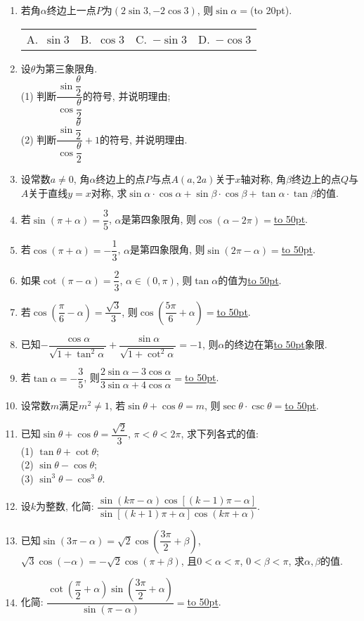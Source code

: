 \documentclass[10pt,a4paper]{article}
\newcommand{\blank}[1]{\underline{\hbox to #1pt{}}}
\newcommand{\bracket}[1]{(\hbox to #1pt{})}
\newcommand{\fourch}[4]{\par\begin{tabular}{p{.23\textwidth}p{.23\textwidth}p{.23\textwidth}p{.23\textwidth}}
A.~#1 &B.~#2& C.~#3& D.~#4
\end{tabular}}
\begin{document}
\begin{enumerate}[1.]
\item 若角$\alpha$终边上一点$P$为$(2\sin 3,-2\cos 3)$, 则$\sin\alpha=$\bracket{20}.
\fourch{$\sin 3$}{$\cos 3$}{$-\sin 3$}{$-\cos 3$}
\item 设$\theta$为第三象限角.\\
(1) 判断$\dfrac{\sin\dfrac{\theta}2}{\cos\dfrac{\theta}2}$的符号, 并说明理由;\\
(2) 判断$\dfrac{\sin \dfrac{\theta }2}{\cos \dfrac{\theta }2}+1$的符号, 并说明理由.
\item 设常数$a\ne 0$, 角$\alpha$终边上的点$P$与点$A(a,2a)$关于$x$轴对称, 角$\beta$终边上的点$Q$与$A$关于直线$y=x$对称, 求$\sin\alpha\cdot \cos\alpha+\sin\beta\cdot\cos\beta+\tan\alpha\cdot\tan\beta$的值.


\item 若$\sin(\pi +\alpha)=\dfrac 35$, $\alpha$是第四象限角, 则$\cos(\alpha-2\pi)=$\blank{50}.
\item 若$\cos(\pi+\alpha)=-\dfrac 13$, $\alpha$是第四象限角, 则$\sin(2\pi-\alpha)=$\blank{50}.
\item 如果$\cot(\pi-\alpha)=\dfrac 23$, $\alpha \in (0,\pi)$, 则$\tan \alpha$的值为\blank{50}.
\item 若$\cos(\dfrac{\pi}6-\alpha)=\dfrac{\sqrt 3}3$, 则$\cos(\dfrac{5\pi}6+\alpha)=$\blank{50}.
\item 已知$-\dfrac{\cos\alpha}{\sqrt{1+\tan^2\alpha}}+\dfrac{\sin\alpha}{\sqrt{1+\cot^2\alpha}}=-1$, 则$\alpha$的终边在第\blank{50}象限.
\item 若$\tan\alpha=-\dfrac 35$, 则$\dfrac{2\sin\alpha-3\cos\alpha}{3\sin\alpha+4\cos\alpha}=$\blank{50}.
\item 设常数$m$满足$m^2\ne 1$, 若$\sin\theta+\cos\theta=m$, 则$\sec\theta\cdot \csc\theta=$\blank{50}.
\item 已知$\sin\theta+\cos\theta=\dfrac{\sqrt 2}3$, $\pi<\theta<2\pi$, 求下列各式的值:\\
(1) $\tan \theta +\cot \theta$;\\
(2) $\sin\theta-\cos\theta$;\\
(3) $\sin^3\theta-\cos^3\theta$.
\item 设$k$为整数, 化简: $\dfrac{\sin (k\pi -\alpha)\cos [(k-1)\pi -\alpha ]}{\sin [(k+1)\pi +\alpha ]\cos (k\pi +\alpha)}$.
\item 已知$\sin (3\pi -\alpha)=\sqrt 2\cos (\dfrac{3\pi }2+\beta)$, $\sqrt 3\cos(-\alpha)=-\sqrt 2\cos(\pi+\beta)$, 且$0<\alpha<\pi$, $0<\beta<\pi$, 求$\alpha,\beta$的值.
\item 化简: $\dfrac{\cot (\dfrac{\pi}2+\alpha)\sin(\dfrac{3\pi}2+\alpha)}{\sin(\pi-\alpha)}=$\blank{50}.

\end{enumerate}
\end{document}
